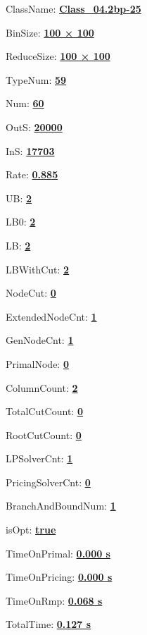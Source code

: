 \documentclass[11pt]{article}
\begin{document}
\pagestyle{empty}


ClassName: \underline{\textbf{Class_04.2bp-25}}
\par
BinSize: \underline{\textbf{100 × 100}}
\par
ReduceSize: \underline{\textbf{100 × 100}}
\par
TypeNum: \underline{\textbf{59}}
\par
Num: \underline{\textbf{60}}
\par
OutS: \underline{\textbf{20000}}
\par
InS: \underline{\textbf{17703}}
\par
Rate: \underline{\textbf{0.885}}
\par
UB: \underline{\textbf{2}}
\par
LB0: \underline{\textbf{2}}
\par
LB: \underline{\textbf{2}}
\par
LBWithCut: \underline{\textbf{2}}
\par
NodeCut: \underline{\textbf{0}}
\par
ExtendedNodeCnt: \underline{\textbf{1}}
\par
GenNodeCnt: \underline{\textbf{1}}
\par
PrimalNode: \underline{\textbf{0}}
\par
ColumnCount: \underline{\textbf{2}}
\par
TotalCutCount: \underline{\textbf{0}}
\par
RootCutCount: \underline{\textbf{0}}
\par
LPSolverCnt: \underline{\textbf{1}}
\par
PricingSolverCnt: \underline{\textbf{0}}
\par
BranchAndBoundNum: \underline{\textbf{1}}
\par
isOpt: \underline{\textbf{true}}
\par
TimeOnPrimal: \underline{\textbf{0.000 s}}
\par
TimeOnPricing: \underline{\textbf{0.000 s}}
\par
TimeOnRmp: \underline{\textbf{0.068 s}}
\par
TotalTime: \underline{\textbf{0.127 s}}
\par
\newpage
\end{document}

